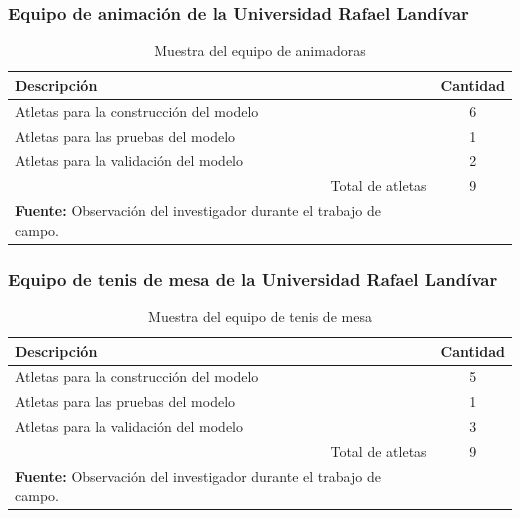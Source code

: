 \subsubsection{Equipo de animaci\'on de la Universidad Rafael Land\'ivar} \label{sj:1t:ani}
\begin{table}[H]
\begin{center}
\caption{Muestra del equipo de animadoras}
\label{tab:MuestraCheerleaders}
\begin{tabular}{lc}
\hline
\multicolumn{1}{|l|}{\textbf{Descripci\'on}} & \multicolumn{1}{l|}{\textbf{Cantidad}} \\ \hline
\multicolumn{1}{|l|}{Atletas para la construcci\'on del modelo} & \multicolumn{1}{c|}{6} \\ \hline
\multicolumn{1}{|l|}{Atletas para las pruebas del modelo} & \multicolumn{1}{c|}{1} \\ \hline
\multicolumn{1}{|l|}{Atletas para la validaci\'on del modelo} & \multicolumn{1}{c|}{2} \\ \hline
\multicolumn{1}{|r|}{Total de atletas} & \multicolumn{1}{c|}{9} \\ \hline
\textbf{Fuente:} Observaci\'on del investigador durante el trabajo de campo.
\end{tabular}
\end{center}
\end{table}
\subsubsection{Equipo de tenis de mesa de la Universidad Rafael Land\'ivar}\label{sj:1t:ten}
\begin{table}[H]
\begin{center}
\caption{Muestra del equipo de tenis de mesa}
\label{tab:MuestraTenis}
\begin{tabular}{lc}
\hline
\multicolumn{1}{|l|}{\textbf{Descripci\'on}} & \multicolumn{1}{l|}{\textbf{Cantidad}} \\ \hline
\multicolumn{1}{|l|}{Atletas para la construcci\'on del modelo} & \multicolumn{1}{c|}{5} \\ \hline
\multicolumn{1}{|l|}{Atletas para las pruebas del modelo} & \multicolumn{1}{c|}{1} \\ \hline
\multicolumn{1}{|l|}{Atletas para la validaci\'on del modelo} & \multicolumn{1}{c|}{3} \\ \hline
\multicolumn{1}{|r|}{Total de atletas} & \multicolumn{1}{c|}{9} \\ \hline
\textbf{Fuente:} Observaci\'on del investigador durante el trabajo de campo.
\end{tabular}
\end{center}
\end{table}
